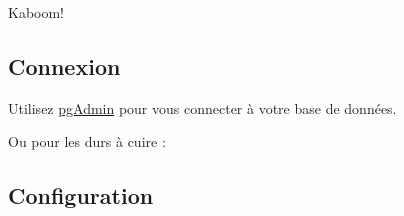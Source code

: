 Kaboom!

\hypertarget{connexion-1}{%
\subsection{Connexion}\label{connexion-1}}

Utilisez \href{https://www.pgadmin.org/}{pgAdmin} pour vous connecter à
votre base de données.

\begin{otherlanguage}{english}

\begin{Shaded}
\begin{Highlighting}[]
\NormalTok{$ }  
\end{Highlighting}
\end{Shaded}

\end{otherlanguage}

Ou pour les durs à cuire :

\begin{otherlanguage}{english}

\begin{Shaded}
\begin{Highlighting}[]
\NormalTok{$ }
\OperatorTok{>}\NormalTok{ \textbackslash{}}
\OperatorTok{>}\NormalTok{ \textbackslash{}}
\OperatorTok{>}\NormalTok{ \textbackslash{}}
\OperatorTok{>}\NormalTok{ \textbackslash{}}
\end{Highlighting}
\end{Shaded}

\end{otherlanguage}

\hypertarget{configuration}{%
\subsection{Configuration}\label{configuration}}

